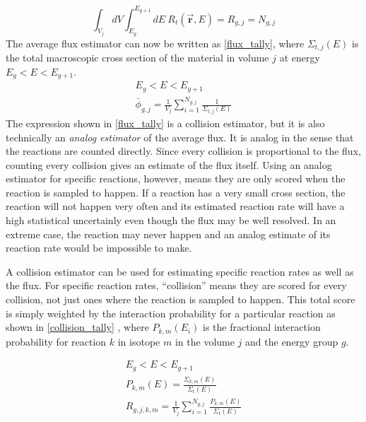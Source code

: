 %
\begin{equation}
\label{RR_coll}
\int_{V_j} dV \int_{E_g}^{E_{g+1}} dE \: R_t(\boldsymbol{\vec{r}},E) = R_{g,j} = N_{g,j}
\end{equation}
%
The average flux estimator can now be written as \eqref{flux_tally}, where $\Sigma_{t,j}(E)$ is the total macroscopic cross section of the material in volume $j$ at energy $E_g < E < E_{g+1}$.
%
\begin{equation}
\label{flux_tally}
\begin{gathered}
E_g < E < E_{g+1} \\
\bar{\phi}_{g,j} =  \frac{1}{V_j} \sum_{i=1}^{N_{g,j}} \frac{1}{\Sigma_{t,j}(E)} 
\end{gathered}
\end{equation}
%
The expression shown in \eqref{flux_tally} is a collision estimator, but it is also technically an \emph{analog estimator} of the average flux.  It is analog in the sense that the reactions are counted directly.  Since every collision is proportional to the flux, counting every collision gives an estimate of the flux itself.  Using an analog estimator for specific reactions, however, means they are only scored when the reaction is sampled to happen.  If a reaction has a very small cross section, the reaction will not happen very often and its estimated reaction rate will have a high statistical uncertainly even though the flux may be well resolved.  In an extreme case, the reaction may never happen and an analog estimate of its reaction rate would be impossible to make.  

A collision estimator can be used for estimating specific reaction rates as well as the flux.  For specific reaction rates, ``collision'' means they are scored for every collision, not just ones where the reaction is sampled to happen.  This total score is simply weighted by the interaction probability for a particular reaction as shown in \eqref{collision_tally} \cite{jaakko}, where $P_{k,m}(E_i)$ is the fractional interaction probability for reaction $k$ in isotope $m$ in the volume $j$ and the energy group $g$.

\begin{equation}
\label{collision_tally}
\begin{gathered}
E_g < E < E_{g+1} \\
P_{k,m}(E)= \frac{\Sigma_{k,m}(E)}{\Sigma_t(E)} \\
R_{g,j,k,m} =  \frac{1}{V_j} \sum_{i=1}^{N_{g,j}} \frac{P_{k,m}(E)}{\Sigma_t(E)}
\end{gathered}
\end{equation}



